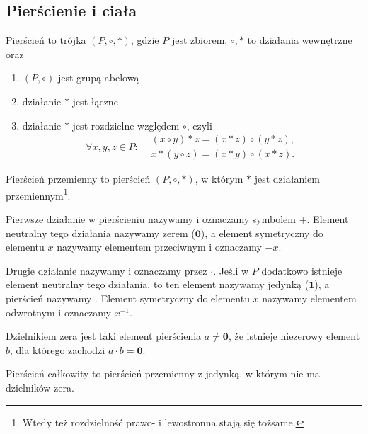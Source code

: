 \subsection{Pierścienie i ciała}
\begin{definition}
    Pierścień to trójka $(P, \circ, *)$, gdzie $P$ jest zbiorem, $\circ, *$ to działania wewnętrzne oraz
    \begin{enumerate}
        \item $(P, \circ)$ jest grupą abelową
        \item działanie $*$ jest łączne
        \item działanie $*$ jest rozdzielne względem $\circ$, czyli
        $$\forall x, y, z \in P : \begin{aligned}& (x \circ y) * z = (x * z) \circ (y * z), \\
                                                 & x * (y \circ z) = (x * y) \circ (x * z).\end{aligned} $$
    \end{enumerate}
\end{definition}

\begin{definition}
    Pierścień przemienny to pierścień $(P, \circ, *)$, w którym $*$ jest działaniem przemiennym\footnote{Wtedy też rozdzielność prawo- i lewostronna stają się tożsame.}.
\end{definition}

Pierwsze działanie w pierścieniu nazywamy  i oznaczamy symbolem $+$. Element neutralny tego działania nazywamy zerem ($\mathbf{0}$), a element symetryczny do elementu $x$ nazywamy elementem przeciwnym i oznaczamy $-x$.

Drugie działanie nazywamy  i oznaczamy przez $\cdot$. Jeśli w $P$ dodatkowo istnieje element neutralny tego działania, to ten element nazywamy jedynką ($\mathbf{1}$), a pierścień nazywamy . Element symetryczny do elementu $x$ nazywamy elementem odwrotnym i oznaczamy $x^{-1}$.

\begin{definition}
    Dzielnikiem zera jest taki element pierścienia $a \neq \mathbf{0}$, że istnieje niezerowy element $b$, dla którego zachodzi $a \cdot b = \mathbf{0}$.
\end{definition}

\begin{definition}
    Pierścień całkowity to pierścień przemienny z jedynką, w którym nie ma dzielników zera.
\end{definition}

